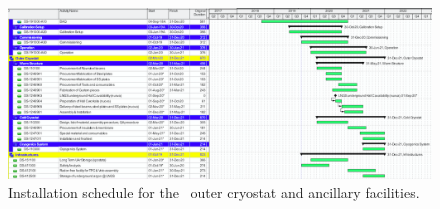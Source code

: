 \vspace{1cm}

\begin{figure}[!h]
\includegraphics[width=1.0\textwidth]{./Figures/cryostat_schedule.png}
\caption{Installation schedule for the \DSks\ outer cryostat and ancillary facilities.}
\label{fig:cryostat_schedule}
\end{figure}



\newpage
